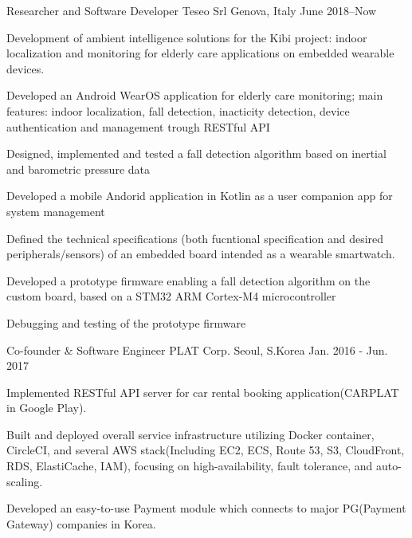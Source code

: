 

\begin{cventries}

  \cventry
    {Researcher and Software Developer} %
    {Teseo Srl} %
    {Genova, Italy} %
    {June 2018--Now} %
    {
      Development of ambient intelligence solutions for the Kibi project: indoor localization and monitoring for elderly care applications on embedded wearable devices.
      \vspace*{16pt}
      \begin{cvitems} %
        \item {Developed an Android WearOS application for elderly care monitoring; main features: indoor localization, fall detection, inacticity detection, device authentication and management trough RESTful API}
        \item {Designed, implemented and tested a fall detection algorithm based on inertial and barometric pressure data}
        \item {Developed a mobile Andorid application in Kotlin as a user companion app for system management}
        \item {Defined the technical specifications (both fucntional specification and desired peripherals/sensors) of an embedded board intended as a wearable smartwatch.}
        \item {
          Developed a prototype firmware enabling a fall detection algorithm on the custom board, based on a STM32 ARM Cortex-M4 microcontroller
        }
        \item{Debugging and testing of the prototype firmware}
      \end{cvitems}
    }
    
  \cventry
    {Co-founder \& Software Engineer} %
    {PLAT Corp.} %
    {Seoul, S.Korea} %
    {Jan. 2016 - Jun. 2017} %
    {
      \begin{cvitems} %
        \item {Implemented RESTful API server for car rental booking application(CARPLAT in Google Play).}
        \item {Built and deployed overall service infrastructure utilizing Docker container, CircleCI, and several AWS stack(Including EC2, ECS, Route 53, S3, CloudFront, RDS, ElastiCache, IAM), focusing on high-availability, fault tolerance, and auto-scaling.}
        \item {Developed an easy-to-use Payment module which connects to major PG(Payment Gateway) companies in Korea.}
      \end{cvitems}
    }
\end{cventries}
